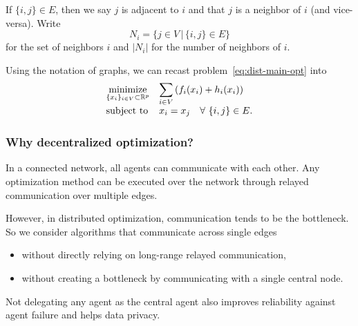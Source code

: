 \documentclass[10pt,mathserif]{beamer}
\begin{document}
\begin{frame}
If $\{i,j\}\in E$, then we say $j$ is adjacent to $i$ and that $j$ is a neighbor of $i$  (and vice-versa).
Write
\[
N_i=\{j\in V\,|\,\{i,j\}\in E\}
\]
for the set of neighbors $i$ and $|N_i|$ for the number of neighbors of $i$.

\vspace{0.2in}


Using the notation of graphs, we can recast problem~\eqref{eq:dist-main-opt} into
\begin{equation}
\begin{array}{ll}
\underset{\{x_i\}_{i\in V}\subset\mathbb{R}^p}{\mbox{minimize}} &\displaystyle{\sum_{i\in V} \left(f_i(x_i)+h_i(x_i)\right)}\\
\mbox{subject to}&x_i=x_j\quad \forall~\{i,j\}\in E.
\end{array} \label{eq:cons_basic_prob_cons}
\end{equation}
\end{frame}



\begin{frame}
\frametitle{Why decentralized optimization?}
In a connected network, all agents can communicate with each other.
Any optimization method can be executed over the network through relayed communication over multiple edges.

\vspace{0.2in}

However, in distributed optimization, communication tends to be the bottleneck.
So we consider algorithms that communicate across single edges 
\begin{itemize}
    \item without directly relying on long-range relayed communication,
    \item without creating a bottleneck by communicating with a single central node.
\end{itemize}
Not delegating any agent as the central agent also improves reliability against agent failure and helps data privacy.



\end{frame}
\end{document}
